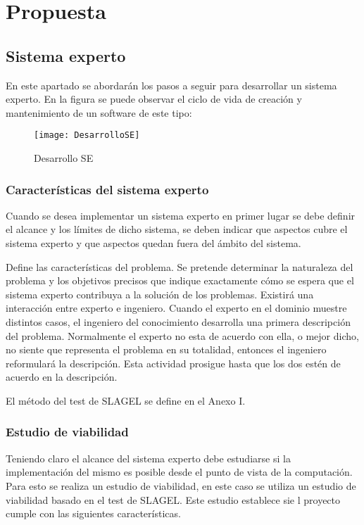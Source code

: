 \chapter{Propuesta}
\label{cap:Propuesta}

\section{Sistema experto}
En este apartado se abordarán los pasos a seguir para desarrollar un sistema experto.
 En la figura se puede observar el ciclo de vida de creación y mantenimiento de un software
 de este tipo:

\begin{figure}[htb]
  \centering
    \texttt{[image: DesarrolloSE]}
  \caption[Desarrollo SE]{Desarrollo SE}
  \label{fig:Desarrollo Sistema Experto}
\end{figure}

\subsection{Características del sistema experto}
Cuando se desea implementar un sistema experto en primer lugar se debe definir el
 alcance y los límites de dicho sistema, se deben indicar que aspectos cubre el
 sistema experto y que aspectos quedan fuera del ámbito del sistema.

Define las características del problema. Se pretende determinar la naturaleza
 del problema y los objetivos precisos que indique exactamente cómo se espera
 que el sistema experto contribuya a la solución de los problemas. Existirá
 una interacción entre experto e ingeniero. Cuando el experto en el dominio
 muestre distintos casos, el ingeniero del conocimiento desarrolla una primera descripción
 del problema. Normalmente el experto no esta de acuerdo con ella, o mejor dicho,
 no siente que representa el problema en su totalidad, entonces el ingeniero reformulará
 la descripción. Esta actividad prosigue hasta que los dos estén de acuerdo en la
 descripción.

El método del test de SLAGEL se define en el Anexo I.

\subsection{Estudio de viabilidad}
Teniendo claro el alcance del sistema experto debe estudiarse si la implementación
 del mismo es posible desde el punto de vista de la computación. Para esto se
 realiza un estudio de viabilidad, en este caso se utiliza un estudio de viabilidad basado
 en el test de SLAGEL. Este estudio establece sie l proyecto cumple con las siguientes
 características.

